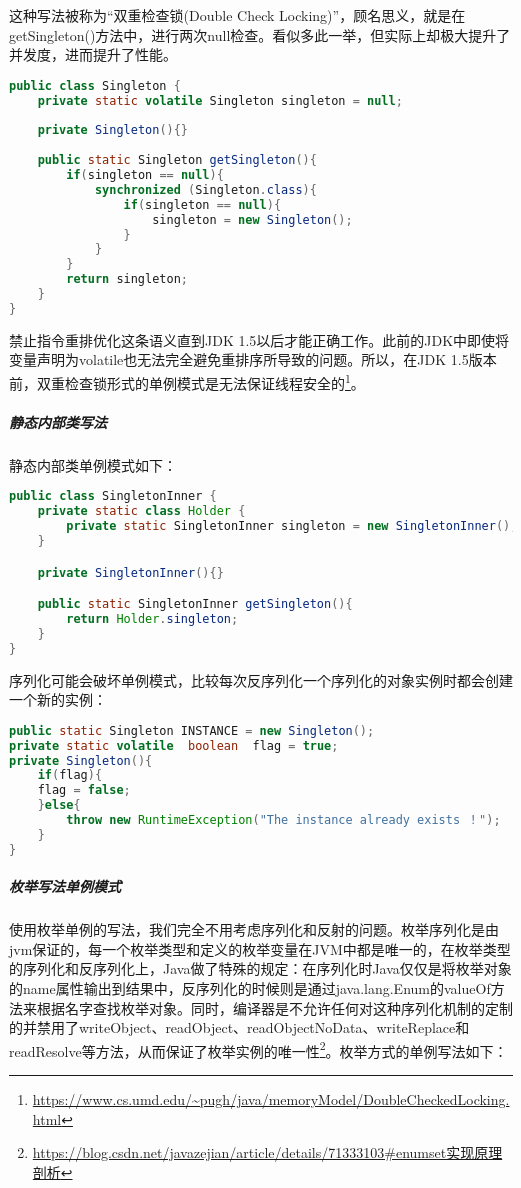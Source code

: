 \documentclass[../../../interview-questions.tex]{subfiles}
\begin{document}
这种写法被称为“双重检查锁(Double Check Locking)”，顾名思义，就是在getSingleton()方法中，进行两次null检查。看似多此一举，但实际上却极大提升了并发度，进而提升了性能。

\begin{lstlisting}[language=Java]
public class Singleton {
    private static volatile Singleton singleton = null;
 
    private Singleton(){}
 
    public static Singleton getSingleton(){
        if(singleton == null){
            synchronized (Singleton.class){
                if(singleton == null){
                    singleton = new Singleton();
                }
            }
        }
        return singleton;
    }    
}
\end{lstlisting}

禁止指令重排优化这条语义直到JDK 1.5以后才能正确工作。此前的JDK中即使将变量声明为volatile也无法完全避免重排序所导致的问题。所以，在JDK 1.5版本前，双重检查锁形式的单例模式是无法保证线程安全的\footnote{\url{https://www.cs.umd.edu/~pugh/java/memoryModel/DoubleCheckedLocking.html}}。

\subparagraph{静态内部类写法}

静态内部类单例模式如下：

\begin{lstlisting}[language=Java]
public class SingletonInner {
    private static class Holder {
        private static SingletonInner singleton = new SingletonInner();
    }

    private SingletonInner(){}

    public static SingletonInner getSingleton(){
        return Holder.singleton;
    }
}
\end{lstlisting}

序列化可能会破坏单例模式，比较每次反序列化一个序列化的对象实例时都会创建一个新的实例：

\begin{lstlisting}[language=Java]
public static Singleton INSTANCE = new Singleton();     
private static volatile  boolean  flag = true;
private Singleton(){
    if(flag){
    flag = false;   
    }else{
        throw new RuntimeException("The instance already exists ！");
    }
}
\end{lstlisting}

\subparagraph{枚举写法单例模式}

使用枚举单例的写法，我们完全不用考虑序列化和反射的问题。枚举序列化是由jvm保证的，每一个枚举类型和定义的枚举变量在JVM中都是唯一的，在枚举类型的序列化和反序列化上，Java做了特殊的规定：在序列化时Java仅仅是将枚举对象的name属性输出到结果中，反序列化的时候则是通过java.lang.Enum的valueOf方法来根据名字查找枚举对象。同时，编译器是不允许任何对这种序列化机制的定制的并禁用了writeObject、readObject、readObjectNoData、writeReplace和readResolve等方法，从而保证了枚举实例的唯一性\footnote{\url{https://blog.csdn.net/javazejian/article/details/71333103\#enumset实现原理剖析}}。枚举方式的单例写法如下：
\end{document}
